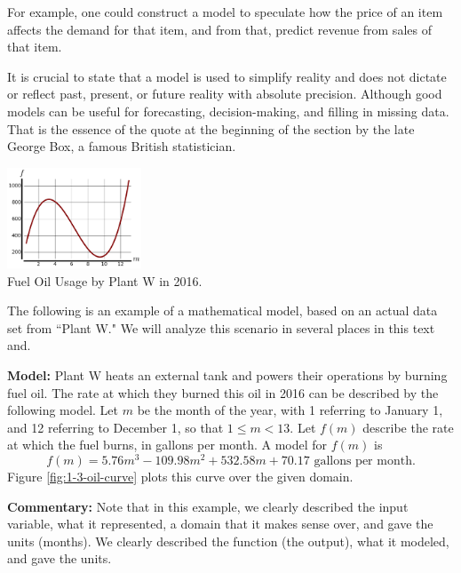 For example, one could construct a model to speculate how the price of an item affects the demand for that item, and from that, predict revenue from sales of that item.

It is crucial to state that a model is used to simplify reality and does not dictate or reflect past, present, or future reality with absolute precision. Although good models can be useful for forecasting, decision-making, and filling in missing data. That is the essence of the quote at the beginning of the section by the late George Box, a famous British statistician.

\begin{floatingfigure}{0.3\textwidth}
    \centering
    \includegraphics[width=0.3\textwidth]{img/chap1/sec1-3/fig1-3-oil.png}\\
    \caption{Fuel Oil Usage by Plant W in 2016.}
    \label{fig:1-3-oil-curve}
\end{floatingfigure}

The following is an example of a mathematical model, based on an actual data set from ``Plant W." We will analyze this scenario in several places in this text and.

{\bf Model:} Plant W heats an external tank and powers their operations by burning fuel oil. The rate at which they burned this oil in 2016 can be described by the following model. Let $m$ be the month of the year, with 1 referring to January 1, and 12 referring to December 1, so that $1\le m < 13$. Let $f(m)$ describe the rate at which the fuel burns, in gallons per month. A model for $f(m)$ is
$$f(m) = 5.76m^3 - 109.98m^2 + 532.58m + 70.17\mbox{ gallons per month.}$$
Figure \ref{fig:1-3-oil-curve} plots this curve over the given domain.

{\bf Commentary:} Note that in this example, we clearly described the input variable, what it represented, a domain that it makes sense over, and gave the units (months). We clearly described the function (the output), what it modeled, and gave the units.

